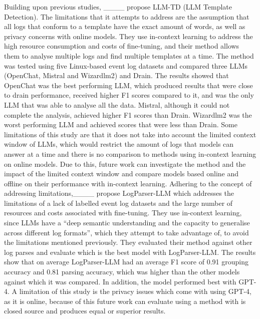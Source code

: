 Building upon previous studies, ____ propose LLM-TD (LLM Template Detection). The limitations that it attempts to address are the assumption that all logs that conform to a template have the exact amount of words, as well as privacy concerns with online models. They use in-context learning to address the high resource consumption and costs of fine-tuning, and their method allows them to analyse multiple logs and find multiple templates at a time. The method was tested using five Linux-based event log datasets and compared three LLMs (OpenChat, Mistral and Wizardlm2) and Drain. The results showed that OpenChat was the best performing LLM, which produced results that were close to drain performance, received higher F1 scores compared to it, and was the only LLM that was able to analyse all the data. Mistral, although it could not complete the analysis, achieved higher F1 scores than Drain. Wizardlm2 was the worst performing LLM and achieved scores that were less than Drain. Some limitations of this study are that it does not take into account the limited context window of LLMs, which would restrict the amount of logs that models can answer at a time and there is no comparison to methods using in-context learning on online models. Due to this, future work can investigate the method and the impact of the limited context window and compare models based online and offline on their performance with in-context learning. Adhering to the concept of addressing limitations,____ propose LogParser-LLM which addresses the limitations of a lack of labelled event log datasets and the large number of resources and costs associated with fine-tuning. They use in-context learning, since LLMs have a ``deep semantic understanding and the capacity to generalise across different log formats'', which they attempt to take advantage of, to avoid the limitations mentioned previously. They evaluated their method against other log parses and evaluate which is the best model with LogParser-LLM. The results show that on average LogParser-LLM had an average F1 score of 0.91 grouping accuracy and 0.81 parsing accuracy, which was higher than the other models against which it was compared. In addition, the model performed best with GPT-4. A limitation of this study is the privacy issues which come with using GPT-4, as it is online, because of this future work can evaluate using a method with is closed source and produces equal or superior results.

